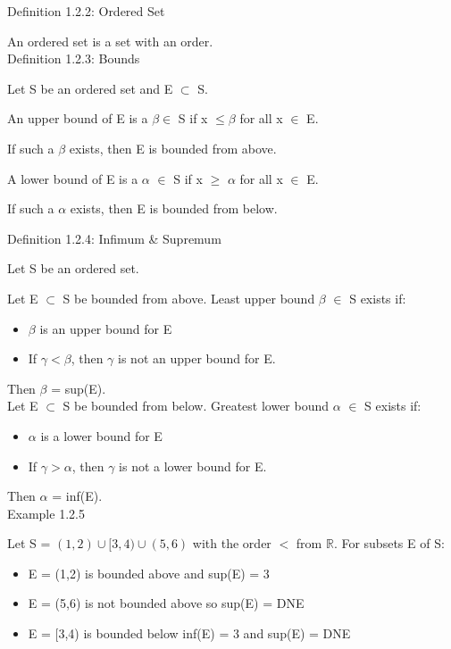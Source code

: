 { \color{blue} Definition 1.2.2: Ordered Set }

\qquad An ordered set is a set with an order. \\

{ \color{blue} Definition 1.2.3: Bounds }

\qquad Let S be an ordered set and E $ \subset $ S.

\qquad An upper bound of E is a $ \beta \in $ S if x $ \leq \beta $ for all x $ \in $ E.

\qquad \qquad If such a $ \beta $ exists, then E is bounded from above.

\qquad A lower bound of E is a $\alpha$ $\in$ S if x $ \geq $ $\alpha$ for all x $\in$ E.

\qquad \qquad If such a $\alpha$ exists, then E is bounded from below.

\newpage

{ \color{blue} Definition 1.2.4: Infimum \& Supremum}

\qquad Let S be an ordered set.

\qquad Let E $ \subset $ S be bounded from above. Least upper bound $\beta$ $\in$ S exists if:
\begin{itemize}[leftmargin=2cm]
	\item $\beta$ is an upper bound for E
	
	\item If $\gamma < \beta$, then $ \gamma $ is not an upper bound for E.
\end{itemize}

\qquad \qquad Then $\beta$ = sup(E). \\

\qquad Let E $\subset$ S be bounded from below. Greatest lower bound $\alpha$ $\in$ S exists if:
\begin{itemize}[leftmargin=2cm]
	\item $\alpha$ is a lower bound for E

	\item If $\gamma > \alpha$, then $\gamma$ is not a lower bound for E.
\end{itemize}

\qquad \qquad Then $\alpha$ = inf(E). \\

{ \color{purple} Example 1.2.5 }

\qquad Let S = $ (1,2) \cup [3,4) \cup (5,6) $ with the order $ < $ from $ \mathbb{R} $.
For subsets E of S:

\begin{itemize}[leftmargin=2cm]
	\item E = (1,2) is bounded above and sup(E) = 3
	
	\item E = (5,6) is not bounded above so sup(E) = DNE
	
	\item E = [3,4) is bounded below inf(E) = 3 and sup(E) = DNE
\end{itemize}

